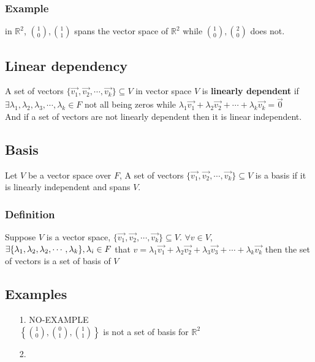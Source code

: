 \documentclass{article}
\begin{document}
\subsubsection{Example}
in \(\mathbb{R}^2\), \(\binom{1}{0},\binom{1}{1}\) spans the vector space of \(\mathbb{R}^2\) while \(\binom{1}{0},\binom{2}{0}\) does not.
\subsection{Linear dependency}
A set of vectors \(\{\overrightarrow{v_1},\overrightarrow{v_2},\cdots,\overrightarrow{v_k}\}\subseteq V\) in vector space \(V\) is \textbf{linearly dependent} if
\(\exists \lambda_1,\lambda_2,\lambda_3,\cdots,\lambda_k\in F\) not all being zeros while \(\lambda_1\overrightarrow{v_1}+\lambda_2\overrightarrow{v_2}+\cdots+\lambda_k\overrightarrow{v_k}=\overrightarrow{0}\)
\\
And if a set of vectors are not linearly dependent then it is linear independent.
\subsection{Basis}
Let \(V\) be a vector space over \(F\), A set of vectors \(\{\overrightarrow{v_1},\overrightarrow{v_2},\cdots,\overrightarrow{v_k}\}\subseteq V\)
is a basis if it is linearly independent and spans \(V\).

\subsubsection{Definition}
Suppose \(V\) is a vector space, \(\{\overrightarrow{v_1},\overrightarrow{v_2},\cdots,\overrightarrow{v_k}\}\subseteq V\).
\(\forall v\in V\), \(\exists\{\lambda_1,\lambda_2,\lambda_2,\cdots,\lambda_k\}, \\ \lambda_i\in F\)
that \(v=\lambda_1\overrightarrow{v_1}+\lambda_2\overrightarrow{v_2}+\lambda_3\overrightarrow{v_3}+\cdots+\lambda_k\overrightarrow{v_k}\)
then the set of vectors is a set of basis of \(V\)
\subsection{Examples}
\begin{itemize}
\item [1.] NO-EXAMPLE\\
\(\displaystyle\left\{\binom{1}{0},\binom{0}{1},\binom{1}{1}\right\}\) is not a set of basis for \(\mathbb{R}^2\)


\item [2.]


\end{itemize}
\end{document}
